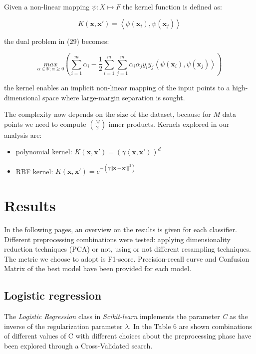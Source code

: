 \documentclass{article}
\begin{document}
Given a non-linear mapping $\psi: X\mapsto F$ the kernel function is defined as:

\begin{equation}
K(\textbf{x},\textbf{x}')= \left \langle \psi(\textbf{x}_{i}),\psi(\textbf{x}_{j}) \right \rangle
\end{equation}

the dual problem in (29) becomes:

\begin{equation}
\underset{\alpha\in\mathbb{R};\alpha\geq0}{max}(\sum_{i=1}^{m}\alpha_{i}-\frac{1}{2}\sum_{i=1}^{m}\sum_{j=1}^{m}\alpha_{i}\alpha_{j}y_{i}y_{j}\left \langle \psi(\textbf{x}_{i}),\psi(\textbf{x}_{j}) \right \rangle)
\end{equation}

the kernel enables an implicit non-linear mapping of the input points to a high-dimensional space where large-margin separation is sought.

The complexity now depends on the size of the dataset, because for $M$ data points we need to compute $\binom{M}{2}$ inner products. Kernels explored in our analysis are:

\begin{itemize}
    \item polynomial kernel: $K( \textbf{x},\textbf{x}')=(\gamma\left \langle \textbf{x}, \textbf{x}' \right \rangle)^{d}$
    \item RBF kernel: $K(\textbf{x},\textbf{x}')=e^{-(\gamma||\textbf{x}-\textbf{x}'||^{2})}$
\end{itemize}

\newpage
\section{Results}

In the following pages, an overview on the results is given for each classifier. Different preprocessing combinations were tested: applying dimensionality reduction techniques (PCA) or not, using or not different resampling techniques. The metric we choose to adopt is F1-score. Precision-recall curve and
Confusion Matrix of the best model have been provided for each model.


\subsection{Logistic regression}
The \textit{Logistic Regression} class in \textit{Scikit-learn} implements the parameter \emph{C} as the inverse of the regularization parameter $\lambda$.
In the Table 6 are shown combinations of different values of C with different choices about the preprocessing phase have been explored through a Cross-Validated search.
\end{document}
